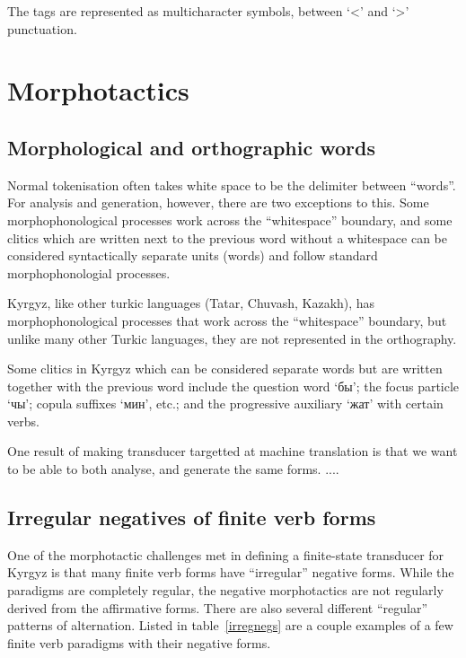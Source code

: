 \documentclass[10pt,a4paper,twocolumn]{article}
\begin{document}
The tags are represented as multicharacter symbols, between `<' and `>' punctuation.


\section{Morphotactics}


\subsection{Morphological and orthographic words}
Normal tokenisation often takes white space to be the delimiter between ``words''.  For analysis and generation, however, there are two exceptions to this.  Some morphophonological processes work across the ``whitespace'' boundary, and some clitics which are written next to the previous word without a whitespace can be considered syntactically separate units (words) and follow standard morphophonologial processes.

Kyrgyz, like other turkic languages (Tatar, Chuvash, Kazakh), has morphophonological processes that work across the ``whitespace'' boundary, but unlike many other Turkic languages, they are not represented in the orthography.

Some clitics in Kyrgyz which can be considered separate words but are written together with the previous word include the question word `бы'; the focus particle `чы'; copula suffixes `мин', etc.; and the progressive auxiliary `жат' with certain verbs.

One result of making transducer targetted at machine translation is that we want to be able to both analyse, and generate the same forms. .... %

\subsection{Irregular negatives of finite verb forms}

One of the morphotactic challenges met in defining a finite-state transducer for Kyrgyz is that many finite verb forms have ``irregular'' negative forms.  While the paradigms are completely regular, the negative morphotactics are not regularly derived from the affirmative forms.  There are also several different ``regular'' patterns of alternation.  Listed in table~\ref{irregnegs} are a couple examples of a few finite verb paradigms with their negative forms.
\end{document}
